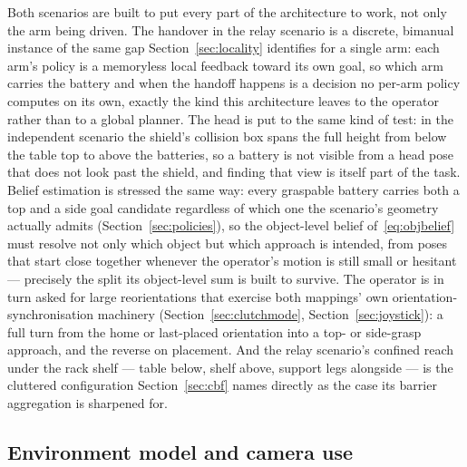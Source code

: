 \documentclass[12pt,a4paper,twoside,openright]{report}
\begin{document}
Both scenarios are built to put every part of the architecture to work, not only the arm being driven. The handover in the relay scenario is a discrete, bimanual instance of the same gap Section~\ref{sec:locality} identifies for a single arm: each arm's policy is a memoryless local feedback toward its own goal, so which arm carries the battery and when the handoff happens is a decision no per-arm policy computes on its own, exactly the kind this architecture leaves to the operator rather than to a global planner. The head is put to the same kind of test: in the independent scenario the shield's collision box spans the full height from below the table top to above the batteries, so a battery is not visible from a head pose that does not look past the shield, and finding that view is itself part of the task. Belief estimation is stressed the same way: every graspable battery carries both a top and a side goal candidate regardless of which one the scenario's geometry actually admits (Section~\ref{sec:policies}), so the object-level belief of~\eqref{eq:objbelief} must resolve not only which object but which approach is intended, from poses that start close together whenever the operator's motion is still small or hesitant --- precisely the split its object-level sum is built to survive. The operator is in turn asked for large reorientations that exercise both mappings' own orientation-synchronisation machinery (Section~\ref{sec:clutchmode}, Section~\ref{sec:joystick}): a full turn from the home or last-placed orientation into a top- or side-grasp approach, and the reverse on placement. And the relay scenario's confined reach under the rack shelf --- table below, shelf above, support legs alongside --- is the cluttered configuration Section~\ref{sec:cbf} names directly as the case its barrier aggregation is sharpened for.

\subsection{Environment model and camera use}
\label{sec:studyenv}
\end{document}
